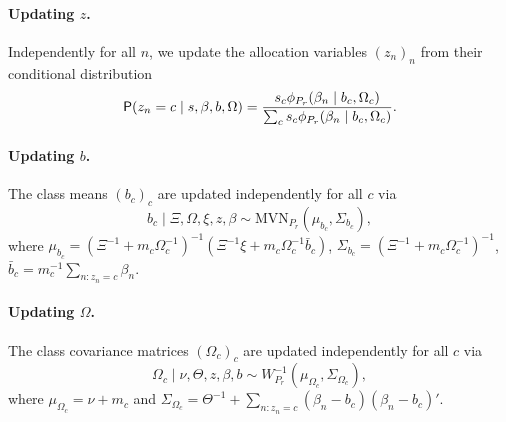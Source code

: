 \documentclass[article]{jss}
\begin{document}
\paragraph{Updating $z$.} Independently for all $n$, we update the allocation variables $(z_n)_n$ from their conditional distribution
\begin{equation}
\mathsf{P}(z_n=c\mid s,\beta,b,\Omega )=\frac{s_c\phi_{P_r}(\beta_n\mid b_c,\Omega_c)}{\sum_c s_c\phi_{P_r}(\beta_n\mid b_c,\Omega_c)}.
\end{equation}

\paragraph{Updating $b$.} The class means $(b_c)_c$ are updated independently for all $c$ via
\begin{equation}
b_c\mid \Xi,\Omega,\xi,z,\beta \sim\text{MVN}_{P_r}\left( \mu_{b_c}, \Sigma_{b_c}  \right),
\end{equation}
where $\mu_{b_c}=(\Xi^{-1}+m_c\Omega_c^{-1})^{-1}(\Xi^{-1}\xi +m_c\Omega_c^{-1}\bar{b}_c)$, $\Sigma_{b_c}=(\Xi^{-1}+m_c\Omega_c^{-1})^{-1}$, $\bar{b}_c=m_c^{-1}\sum_{n:z_n=c} \beta_n$.

\paragraph{Updating $\Omega$.} The class covariance matrices $(\Omega_c)_c$ are updated independently for all $c$ via
\begin{equation}
\Omega_c \mid \nu,\Theta,z,\beta,b \sim W^{-1}_{P_r}(\mu_{\Omega_c},\Sigma_{\Omega_c}),
\end{equation}
where $\mu_{\Omega_c}=\nu+m_c$ and $\Sigma_{\Omega_c}=\Theta^{-1} + \sum_{n:z_n=c} (\beta_n-b_c)(\beta_n-b_c)'$.
\end{document}
